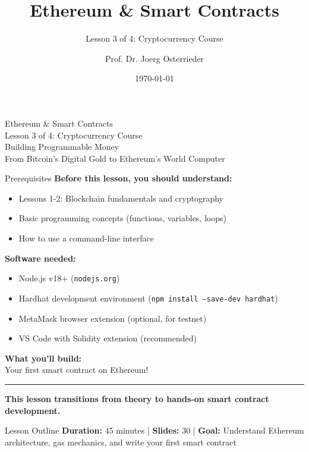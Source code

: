 \documentclass[8pt,aspectratio=169]{beamer}
\title{Ethereum \& Smart Contracts}
\subtitle{Lesson 3 of 4: Cryptocurrency Course}
\author{Prof. Dr. Joerg Osterrieder}
\institute{Academic Presentation}
\date{\today}
\newcommand{\bottomnote}[1]{%
\vfill
\vspace{-2mm}
\textcolor{mllavender2}{\rule{\textwidth}{0.4pt}}
\vspace{1mm}
\footnotesize
\textbf{#1}
}
\begin{document}
\begin{frame}[plain]
\vspace{2cm}
\begin{center}
{\Huge Ethereum \& Smart Contracts}\\[0.5cm]
{\Large Lesson 3 of 4: Cryptocurrency Course}\\[1.5cm]
{\normalsize Building Programmable Money}\\[0.5cm]
{\small From Bitcoin's Digital Gold to Ethereum's World Computer}
\end{center}
\end{frame}

\begin{frame}{Prerequisites}
\textbf{Before this lesson, you should understand:}
\begin{itemize}
\item Lessons 1-2: Blockchain fundamentals and cryptography
\item Basic programming concepts (functions, variables, loops)
\item How to use a command-line interface
\end{itemize}

\vspace{1em}
\textbf{Software needed:}
\begin{itemize}
\item Node.js v18+ (\texttt{nodejs.org})
\item Hardhat development environment (\texttt{npm install --save-dev hardhat})
\item MetaMask browser extension (optional, for testnet)
\item VS Code with Solidity extension (recommended)
\end{itemize}

\vspace{1em}
\textbf{What you'll build:}\\
Your first smart contract on Ethereum!

\bottomnote{This lesson transitions from theory to hands-on smart contract development.}
\end{frame}

\begin{frame}[t]{Lesson Outline}
\tableofcontents
\vfill
\footnotesize
\textbf{Duration:} 45 minutes | \textbf{Slides:} 30 | \textbf{Goal:} Understand Ethereum architecture, gas mechanics, and write your first smart contract
\end{frame}
\end{document}
